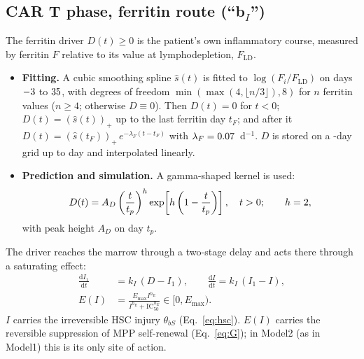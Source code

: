 \documentclass[11pt]{article}
\newcommand{\dd}{\mathrm{d}}
\newcommand{\pos}[1]{\left(#1\right)_{+}}
\begin{document}
\subsection{CAR T phase, ferritin route \texorpdfstring{(``b$_I$'')}{(b-I)}}
The ferritin driver $D(t)\geq 0$ is the patient's own inflammatory course, measured by ferritin $F$ relative to its value at lymphodepletion, $F_{\mathrm{LD}}$.
\begin{itemize}
\item \textbf{Fitting.} A cubic smoothing spline $\hat s(t)$ is fitted to $\log(F_i/F_{\mathrm{LD}})$ on days $-3$ to $35$, with degrees of freedom $\min(\max(4,\lfloor n/3\rfloor),8)$ for $n$ ferritin values ($n\geq4$; otherwise $D\equiv0$). Then $D(t)=0$ for $t<0$; $D(t)=\pos{\hat s(t)}$ up to the last ferritin day $t_F$; and after it $D(t)=\pos{\hat s(t_F)}\,e^{-\lambda_F(t-t_F)}$ with $\lambda_F=0.07$~d$^{-1}$. $D$ is stored on a \valDrvDt-day grid up to day \valDrvEnd{} and interpolated linearly.
\item \textbf{Prediction and simulation.} A gamma-shaped kernel is used:
\begin{equation}
D(t) = A_D\left(\frac{t}{t_p}\right)^{h}\exp\!\left[h\left(1-\frac{t}{t_p}\right)\right],\quad t>0;\qquad h=2, \label{eq:kernel}
\end{equation}
with peak height $A_D$ on day $t_p$.
\end{itemize}
The driver reaches the marrow through a two-stage delay and acts there through a saturating effect:
\begin{align}
\frac{\dd I_1}{\dd t} &= k_I\,(D - I_1), \qquad \frac{\dd I}{\dd t} = k_I\,(I_1 - I), \label{eq:lag}\\
E(I) &= \frac{E_{\max} I^{h_E}}{I^{h_E} + \mathrm{IC}_{50}^{h_E}} \in [0, E_{\max}). \label{eq:E}
\end{align}
$I$ carries the irreversible HSC injury $\theta_{bS}$ (Eq.~\ref{eq:hsc}). $E(I)$ carries the reversible suppression of MPP self-renewal (Eq.~\ref{eq:G}); in Model2 (as in Model1) this is its only site of action.
\end{document}
